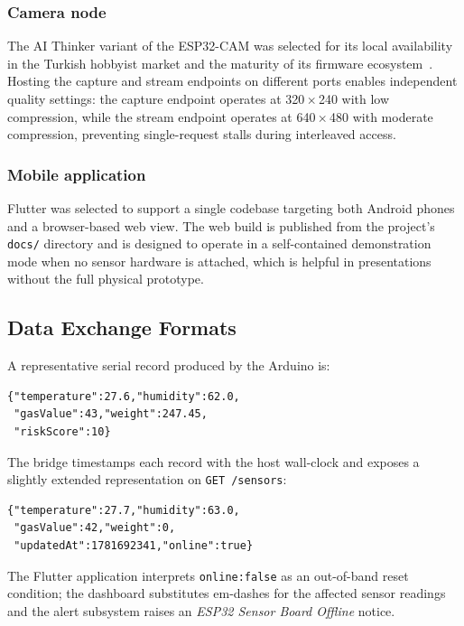 \subsubsection{Camera node}
The AI Thinker variant of the ESP32-CAM was selected for its local
availability in the Turkish hobbyist market and the maturity of its
firmware ecosystem~\cite{esp32cam}. Hosting the capture and stream
endpoints on different ports enables independent quality settings:
the capture endpoint operates at 320\,$\times$\,240 with low
compression, while the stream endpoint operates at
640\,$\times$\,480 with moderate compression, preventing
single-request stalls during interleaved access.

\subsubsection{Mobile application}
Flutter was selected to support a single codebase targeting both
Android phones and a browser-based web view. The web build is
published from the project's \texttt{docs/} directory and is
designed to operate in a self-contained demonstration mode when no
sensor hardware is attached, which is helpful in presentations
without the full physical prototype.

\subsection{Data Exchange Formats}

A representative serial record produced by the Arduino is:

\begin{lstlisting}
{"temperature":27.6,"humidity":62.0,
 "gasValue":43,"weight":247.45,
 "riskScore":10}
\end{lstlisting}

The bridge timestamps each record with the host wall-clock and
exposes a slightly extended representation on \texttt{GET /sensors}:

\begin{lstlisting}
{"temperature":27.7,"humidity":63.0,
 "gasValue":42,"weight":0,
 "updatedAt":1781692341,"online":true}
\end{lstlisting}

The Flutter application interprets \texttt{online:false} as an
out-of-band reset condition; the dashboard substitutes em-dashes for
the affected sensor readings and the alert subsystem raises an
\emph{ESP32 Sensor Board Offline} notice.

